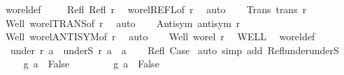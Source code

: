 \begin{isabellebody}
\ wo{\isacharunderscore}{\kern0pt}rel{\isacharunderscore}{\kern0pt}def\ \isacommand{{\isachardot}{\kern0pt}}\isamarkupfalse%
\isanewline
\ \ \isamarkupfalse%
\ Refl{\isacharcolon}{\kern0pt}\ {\isachardoublequoteopen}Refl\ r{\isachardoublequoteclose}\ \isamarkupfalse%
\ wo{\isacharunderscore}{\kern0pt}rel{\isachardot}{\kern0pt}REFL{\isacharbrackleft}{\kern0pt}of\ r{\isacharbrackright}{\kern0pt}\ \isamarkupfalse%
\ auto\isanewline
\ \ \isamarkupfalse%
\ Trans{\isacharcolon}{\kern0pt}\ {\isachardoublequoteopen}trans\ r{\isachardoublequoteclose}\ \isamarkupfalse%
\ Well\ wo{\isacharunderscore}{\kern0pt}rel{\isachardot}{\kern0pt}TRANS{\isacharbrackleft}{\kern0pt}of\ r{\isacharbrackright}{\kern0pt}\ \isamarkupfalse%
\ auto\isanewline
\ \ \isamarkupfalse%
\ Antisym{\isacharcolon}{\kern0pt}\ {\isachardoublequoteopen}antisym\ r{\isachardoublequoteclose}\ \isamarkupfalse%
\ Well\ wo{\isacharunderscore}{\kern0pt}rel{\isachardot}{\kern0pt}ANTISYM{\isacharbrackleft}{\kern0pt}of\ r{\isacharbrackright}{\kern0pt}\ \isamarkupfalse%
\ auto\isanewline
\ \ \isamarkupfalse%
\ Well{\isacharprime}{\kern0pt}{\isacharcolon}{\kern0pt}\ {\isachardoublequoteopen}wo{\isacharunderscore}{\kern0pt}rel\ r{\isacharprime}{\kern0pt}{\isachardoublequoteclose}\ \isamarkupfalse%
\ WELL{\isacharprime}{\kern0pt}\ \isamarkupfalse%
\ wo{\isacharunderscore}{\kern0pt}rel{\isacharunderscore}{\kern0pt}def\ \isacommand{{\isachardot}{\kern0pt}}\isamarkupfalse%
\isanewline
\ \ \isanewline
\ \ \isamarkupfalse%
\ {}{\isacharcolon}{\kern0pt}\ {\isachardoublequoteopen}under\ r\ a\ {\isacharequal}{\kern0pt}\ underS\ r\ a\ {\isasymunion}\ {\isacharbraceleft}{\kern0pt}a{\isacharbraceright}{\kern0pt}{\isachardoublequoteclose}\isanewline
\ \ \isamarkupfalse%
\ Refl\ Case\ \isamarkupfalse%
{\isacharparenleft}{\kern0pt}auto\ simp\ add{\isacharcolon}{\kern0pt}\ Refl{\isacharunderscore}{\kern0pt}under{\isacharunderscore}{\kern0pt}underS{\isacharparenright}{\kern0pt}\isanewline
\ \ \isanewline
\ \ \isamarkupfalse%
\ {}{\isacharcolon}{\kern0pt}\ {\isachardoublequoteopen}g\ a\ {\isacharequal}{\kern0pt}\ False{\isachardoublequoteclose}\isanewline
\ \ \isamarkupfalse%
{\isacharminus}{\kern0pt}\isanewline
\ \ \ \ \isacommand{{\isacharbraceleft}{\kern0pt}}\isamarkupfalse%
\isamarkupfalse%
\ {\isachardoublequoteopen}g\ a\ {\isasymnoteq}\ False{\isachardoublequoteclose}\isanewline

\end{isabellebody}
